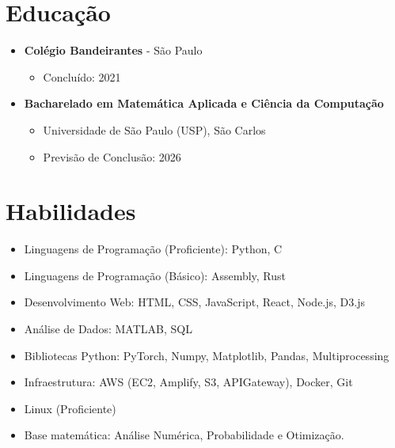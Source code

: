 \documentclass[a4paper,12pt]{article}
\begin{document}
\section*{Educação}
\vspace{-0.5em}
\begin{itemize}[leftmargin=*, itemsep=-1.5pt]
  \item \textbf{Colégio Bandeirantes} - São Paulo
    \begin{itemize}[itemsep=-1pt]
      \item Concluído: 2021
    \end{itemize}
  \item \textbf{Bacharelado em Matemática Aplicada e Ciência da Computação}
    \begin{itemize}[itemsep=-1pt]
      \item Universidade de São Paulo (USP), São Carlos
      \item Previsão de Conclusão: 2026
    \end{itemize}
\end{itemize}
\vspace{-0.5em}

\section*{Habilidades}
\vspace{-0.5em}
\begin{itemize}[leftmargin=*, itemsep=-1.5pt]
  \item Linguagens de Programação (Proficiente): Python, C
  \item Linguagens de Programação (Básico): Assembly, Rust
  \item Desenvolvimento Web: HTML, CSS, JavaScript, React, Node.js, D3.js
  \item Análise de Dados: MATLAB, SQL
  \item Bibliotecas Python: PyTorch, Numpy, Matplotlib, Pandas, Multiprocessing
  \item Infraestrutura: AWS (EC2, Amplify, S3, APIGateway), Docker, Git
  \item Linux (Proficiente)
  \item Base matemática: Análise Numérica, Probabilidade e Otimização.
\end{itemize}
\vspace{-0.5em}
\end{document}
